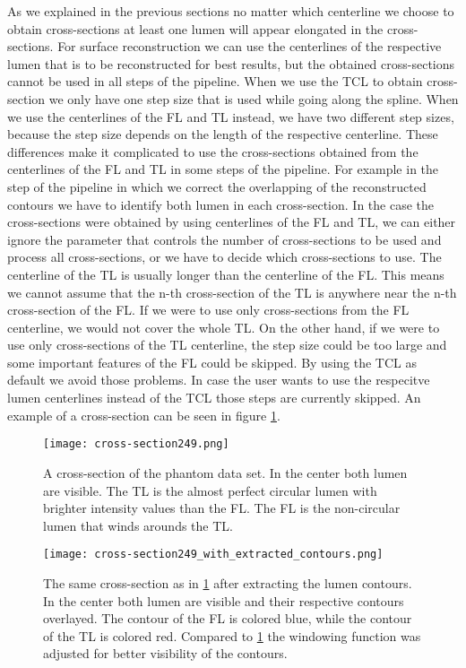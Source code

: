 \documentclass[thesis.tex]{subfiles}
\begin{document}
As we explained in the previous sections no matter which centerline we choose to obtain cross-sections at least one lumen will appear elongated in the cross-sections. For surface reconstruction we can use the centerlines of the respective lumen that is to be reconstructed for best results, but the obtained cross-sections cannot be used in all steps of the pipeline. 
When we use the TCL to obtain cross-section we only have one step size that is used while going along the spline. When we use the centerlines of the FL and TL instead, we have two different step sizes, because the step size depends on the length of the respective centerline. These differences make it complicated to use the cross-sections obtained from the centerlines of the FL and TL in some steps of the pipeline. For example in the step of the pipeline in which we correct the overlapping of the reconstructed contours we have to identify both lumen in each cross-section. In the case the cross-sections were obtained by using centerlines of the FL and TL, we can either ignore the parameter that controls the number of cross-sections to be used and process all cross-sections, or we have to decide which cross-sections to use.
The centerline of the TL is usually longer than the centerline of the FL. This means we cannot assume that the n-th cross-section of the TL is anywhere near the n-th cross-section of the FL. If we were to use only cross-sections from the FL centerline, we would not cover the whole TL. On the other hand, if we were to use only cross-sections of the TL centerline, the step size could be too large and some important features of the FL could be skipped. By using the TCL as default we avoid those problems. In case the user wants to use the respecitve lumen centerlines instead of the TCL those steps are currently skipped. An example of a cross-section can be seen in figure \ref{fig:cross-section}.

\begin{figure}[h]
\centering
\texttt{[image: cross-section249.png]}
\caption{A cross-section of the phantom data set. In the center both lumen are visible. The TL is the almost perfect circular lumen with brighter intensity values than the FL. The FL is the non-circular lumen that winds arounds the TL.}
\label{fig:cross-section}
\end{figure}  

\begin{figure}[h]
\centering
\texttt{[image: cross-section249\_with\_extracted\_contours.png]}
\caption{The same cross-section as in \ref{fig:cross-section} after extracting the lumen contours. In the center both lumen are visible and their respective contours overlayed. The contour of the FL is colored blue, while the contour of the TL is colored red. Compared to \ref{fig:cross-section} the windowing function was adjusted for better visibility of the contours.}
\label{fig:extracted_contours}
\end{figure} 
\end{document}
